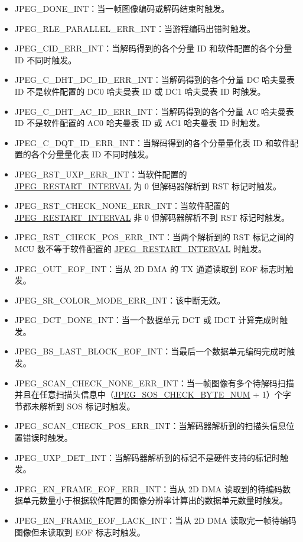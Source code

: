 \documentclass[main\_\_CN.tex]{subfiles}
\begin{document}
\begin{itemize}
\item JPEG\_DONE\_INT：当一帧图像编码或解码结束时触发。
\item JPEG\_RLE\_PARALLEL\_ERR\_INT：当游程编码出错时触发。
\item JPEG\_CID\_ERR\_INT：当解码得到的各个分量 ID 和软件配置的各个分量 ID 不同时触发。
\item JPEG\_C\_DHT\_DC\_ID\_ERR\_INT：当解码得到的各个分量 DC 哈夫曼表 ID 不是软件配置的 DC0 哈夫曼表 ID 或 DC1 哈夫曼表 ID 时触发。
\item JPEG\_C\_DHT\_AC\_ID\_ERR\_INT：当解码得到的各个分量 AC 哈夫曼表 ID 不是软件配置的 AC0 哈夫曼表 ID 或 AC1 哈夫曼表 ID 时触发。
\item JPEG\_C\_DQT\_ID\_ERR\_INT：当解码得到的各个分量量化表 ID 和软件配置的各个分量量化表 ID 不同时触发。
\item JPEG\_RST\_UXP\_ERR\_INT：当软件配置的 \hyperref[fielddesc:JPEGRESTARTINTERVAL]{JPEG\_RESTART\_INTERVAL} 为 0 但解码器解析到 RST 标记时触发。
\item JPEG\_RST\_CHECK\_NONE\_ERR\_INT：当软件配置的 \hyperref[fielddesc:JPEGRESTARTINTERVAL]{JPEG\_RESTART\_INTERVAL} 非 0 但解码器解析不到 RST 标记时触发。
\item JPEG\_RST\_CHECK\_POS\_ERR\_INT：当两个解析到的 RST 标记之间的 MCU 数不等于软件配置的 \hyperref[fielddesc:JPEGRESTARTINTERVAL]{JPEG\_RESTART\_INTERVAL} 时触发。
\item JPEG\_OUT\_EOF\_INT：当从 2D DMA 的 TX 通道读取到 EOF 标志时触发。
\item JPEG\_SR\_COLOR\_MODE\_ERR\_INT：该中断无效。
\item JPEG\_DCT\_DONE\_INT：当一个数据单元 DCT 或 IDCT 计算完成时触发。
\item JPEG\_BS\_LAST\_BLOCK\_EOF\_INT：当最后一个数据单元编码完成时触发。
\item JPEG\_SCAN\_CHECK\_NONE\_ERR\_INT：当一帧图像有多个待解码扫描并且在任意扫描头信息中（\hyperref[fielddesc:JPEGSOSCHECKBYTENUM]{JPEG\_SOS\_CHECK\_BYTE\_NUM} + 1）个字节都未解析到 SOS 标记时触发。
\item JPEG\_SCAN\_CHECK\_POS\_ERR\_INT：当解码器解析到的扫描头信息位置错误时触发。
\item JPEG\_UXP\_DET\_INT：当解码器解析到的标记不是硬件支持的标记时触发。
\item JPEG\_EN\_FRAME\_EOF\_ERR\_INT：当从 2D DMA 读取到的待编码数据单元数量小于根据软件配置的图像分辨率计算出的数据单元数量时触发。
\item JPEG\_EN\_FRAME\_EOF\_LACK\_INT：当从 2D DMA 读取完一帧待编码图像但未读取到 EOF 标志时触发。

\end{itemize}
\end{document}
